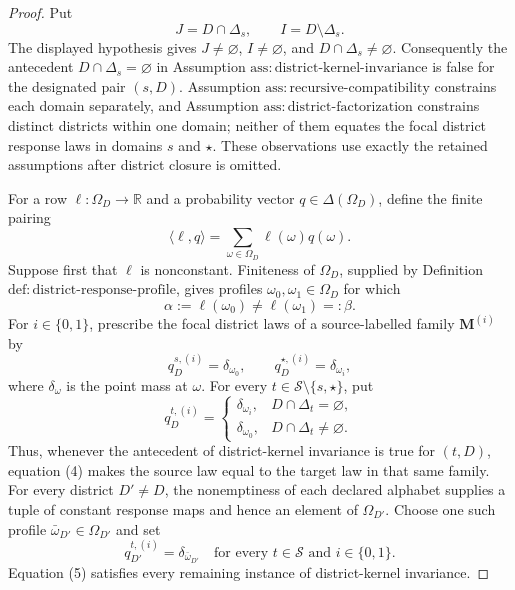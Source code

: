 \documentclass{article}
\begin{document}
\begin{proof}
Put
\[
J=D\cap\Delta_s,
\qquad
I=D\setminus\Delta_s.
\]
The displayed hypothesis gives \(J\ne\varnothing\), \(I\ne\varnothing\), and \(D\cap\Delta_s\ne\varnothing\).  Consequently the antecedent \(D\cap\Delta_s=\varnothing\) in Assumption \(\mathrm{ass:district\text{-}kernel\text{-}invariance}\) is false for the designated pair \((s,D)\).  Assumption \(\mathrm{ass:recursive\text{-}compatibility}\) constrains each domain separately, and Assumption \(\mathrm{ass:district\text{-}factorization}\) constrains distinct districts within one domain; neither of them equates the focal district response laws in domains \(s\) and \(\star\).  These observations use exactly the retained assumptions after district closure is omitted.

For a row \(\ell:\Omega_D\to\mathbb R\) and a probability vector \(q\in\Delta(\Omega_D)\), define the finite pairing
\[
\langle\ell,q\rangle
=\sum_{\omega\in\Omega_D}\ell(\omega)q(\omega).
\tag{1}
\]
Suppose first that \(\ell\) is nonconstant.  Finiteness of \(\Omega_D\), supplied by Definition \(\mathrm{def:district\text{-}response\text{-}profile}\), gives profiles \(\omega_0,\omega_1\in\Omega_D\) for which
\[
\alpha:=\ell(\omega_0)\ne\ell(\omega_1)=:\beta.
\tag{2}
\]
For \(i\in\{0,1\}\), prescribe the focal district laws of a source-labelled family \(\mathbf M^{(i)}\) by
\[
q_D^{s,(i)}=\delta_{\omega_0},
\qquad
q_D^{\star,(i)}=\delta_{\omega_i},
\tag{3}
\]
where \(\delta_\omega\) is the point mass at \(\omega\).  For every \(t\in\mathcal S\setminus\{s,\star\}\), put
\[
q_D^{t,(i)}=
\begin{cases}
\delta_{\omega_i},&D\cap\Delta_t=\varnothing,\\
\delta_{\omega_0},&D\cap\Delta_t\ne\varnothing.
\end{cases}
\tag{4}
\]
Thus, whenever the antecedent of district-kernel invariance is true for \((t,D)\), equation (4) makes the source law equal to the target law in that same family.  For every district \(D'\ne D\), the nonemptiness of each declared alphabet supplies a tuple of constant response maps and hence an element of \(\Omega_{D'}\).  Choose one such profile \(\bar\omega_{D'}\in\Omega_{D'}\) and set
\[
q_{D'}^{t,(i)}=\delta_{\bar\omega_{D'}}
\quad
\text{for every }t\in\mathcal S\text{ and }i\in\{0,1\}.
\tag{5}
\]
Equation (5) satisfies every remaining instance of district-kernel invariance.


\end{proof}
\end{document}
